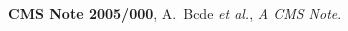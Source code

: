 \begin{thebibliography}{99}

 \textbf{CMS Note 2005/000},
  A.~Bcde \textit{et al.},
  \textit{A CMS Note}.

\end{thebibliography}



